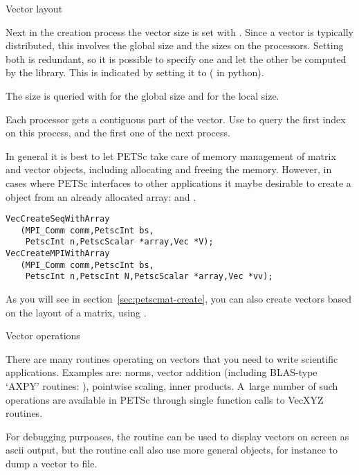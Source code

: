  {Vector layout}

Next in the creation process the vector size is set with .
Since a
vector is typically distributed, this involves the global size and the
sizes on the processors. Setting both is redundant, so it is possible
to specify one and let the other be computed by the library. This is
indicated by setting it to 
( in python).

The size is queried with  for the global size
and  for the local size.

Each processor gets a contiguous part of the vector. Use
 to query the first index on this
process, and the first one of the next process.

In general it is best to let PETSc take care of memory management of
matrix and vector objects, including allocating and freeing the memory.
However, in cases where PETSc interfaces to other applications it maybe desirable
to create a  object from an already
allocated array:  and
.
\begin{lstlisting}
VecCreateSeqWithArray
   (MPI_Comm comm,PetscInt bs,
    PetscInt n,PetscScalar *array,Vec *V);
VecCreateMPIWithArray
   (MPI_Comm comm,PetscInt bs,
    PetscInt n,PetscInt N,PetscScalar *array,Vec *vv);  
\end{lstlisting}

As you will see in section~\ref{sec:petscmat-create},
you can also create vectors based on the layout of a matrix,
using .

 {Vector operations}

There are many routines operating on vectors that you need
to write scientific applications. Examples are: norms, vector addition
(including \ac{BLAS}-type `AXPY' routines: ),
pointwise scaling, inner products.
A~large number of such operations are available in PETSc through
single function calls to {VecXYZ} routines.

For debugging purpoases,
the  routine can be used to display vectors on screen as
ascii output,
%
%
but the routine call also use more general  objects, for
instance to dump a vector to file.

